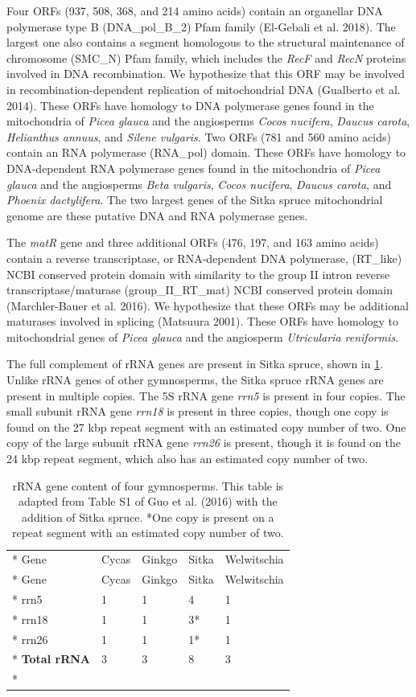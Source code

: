 \documentclass[
  12pt,
  oneside,
  openany]{book}
\begin{document}
Four ORFs (937, 508, 368, and 214 amino acids) contain an organellar DNA polymerase type B (DNA\_pol\_B\_2) Pfam family (El-Gebali et al. 2018). The largest one also contains a segment homologous to the structural maintenance of chromosome (SMC\_N) Pfam family, which includes the \emph{RecF} and \emph{RecN} proteins involved in DNA recombination. We hypothesize that this ORF may be involved in recombination-dependent replication of mitochondrial DNA (Gualberto et al. 2014). These ORFs have homology to DNA polymerase genes found in the mitochondria of \emph{Picea glauca} and the angiosperms \emph{Cocos nucifera}, \emph{Daucus carota}, \emph{Helianthus annuus}, and \emph{Silene vulgaris}. Two ORFs (781 and 560 amino acids) contain an RNA polymerase (RNA\_pol) domain. These ORFs have homology to DNA-dependent RNA polymerase genes found in the mitochondria of \emph{Picea glauca} and the angiosperms \emph{Beta vulgaris}, \emph{Cocos nucifera}, \emph{Daucus carota}, and \emph{Phoenix dactylifera}. The two largest genes of the Sitka spruce mitochondrial genome are these putative DNA and RNA polymerase genes.

The \emph{matR} gene and three additional ORFs (476, 197, and 163 amino acids) contain a reverse transcriptase, or RNA-dependent DNA polymerase, (RT\_like) NCBI conserved protein domain with similarity to the group II intron reverse transcriptase/maturase (group\_II\_RT\_mat) NCBI conserved protein domain (Marchler-Bauer et al. 2016). We hypothesize that these ORFs may be additional maturases involved in splicing (Matsuura 2001). These ORFs have homology to mitochondrial genes of \emph{Picea glauca} and the angiosperm \emph{Utricularia reniformis}.

The full complement of rRNA genes are present in Sitka spruce, shown in \cref{tbl:rrna}. Unlike rRNA genes of other gymnosperms, the Sitka spruce rRNA genes are present in multiple copies. The 5S rRNA gene \emph{rrn5} is present in four copies. The small subunit rRNA gene \emph{rrn18} is present in three copies, though one copy is found on the 27 kbp repeat segment with an estimated copy number of two. One copy of the large subunit rRNA gene \emph{rrn26} is present, though it is found on the 24 kbp repeat segment, which also has an estimated copy number of two.

\hypertarget{tbl:rrna}{}
\begin{singlespace}
\small
\begin{longtable}[]{@{}lllll@{}}
\caption[rRNA gene content of four gymnosperms.]{\label{tbl:rrna}rRNA gene content of four gymnosperms. This table is adapted from Table S1 of Guo et al. (2016) with the addition of Sitka spruce. *One copy is present on a repeat segment with an estimated copy number of two.}\tabularnewline*
\toprule
Gene & Cycas & Ginkgo & Sitka & Welwitschia\tabularnewline*
\midrule
\endfirsthead
\toprule
Gene & Cycas & Ginkgo & Sitka & Welwitschia\tabularnewline*
\midrule
\endhead
rrn5 & 1 & 1 & 4 & 1\tabularnewline*
rrn18 & 1 & 1 & 3* & 1\tabularnewline*
rrn26 & 1 & 1 & 1* & 1\tabularnewline*
\textbf{Total rRNA} & 3 & 3 & 8 & 3\tabularnewline*
\bottomrule
\end{longtable}
\end{singlespace}
\end{document}
